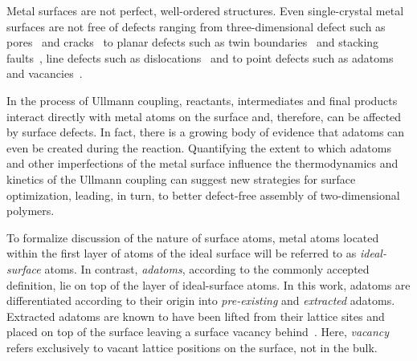 \documentclass[%
 reprint,
 amsmath,amssymb,
 aps,
prb,
floatfix,
]{revtex4-2}
\newcommand{\lock}{\color{red}}
\newcommand{\lock}{\color{red}}
\begin{document}
{\lock

Metal surfaces are not perfect, well-ordered structures. Even single-crystal metal surfaces are not free of defects ranging from three-dimensional defect such as pores~\cite{ullmann_72} and cracks~\cite{ullmann_73} to planar defects such as twin boundaries~\cite{ullmann_74} and stacking faults~\cite{ullmann_75}, line defects such as dislocations~\cite{Ullmann_76} and to point defects such as adatoms~\cite{Ullmann_77} and vacancies~\cite{ullmann_78}.

In the process of Ullmann coupling, reactants, intermediates and final products interact directly with metal atoms on the surface and, therefore, can be affected by surface defects. 
In fact, there is a growing body of evidence that adatoms can even be created during the reaction. 
Quantifying the extent to which adatoms and other imperfections of the metal surface influence the thermodynamics and kinetics of the Ullmann coupling can suggest new strategies for surface optimization, leading, in turn, to better defect-free assembly of two-dimensional polymers. 


To formalize discussion of the nature of surface atoms, metal atoms located within the first layer of atoms of the ideal surface will be referred to as \emph{ideal-surface} atoms. In contrast, \emph{adatoms}, according to the commonly accepted definition, lie on top of the layer of ideal-surface atoms. In this work, adatoms are differentiated according to their origin into \emph{pre-existing} and \emph{extracted} adatoms. %
Extracted adatoms are known to have been lifted from their lattice sites and placed on top of the surface leaving a surface vacancy behind~\cite{ullmann_96}. Here, \emph{vacancy} refers exclusively to vacant lattice positions on the surface, not in the bulk.

}
\end{document}
